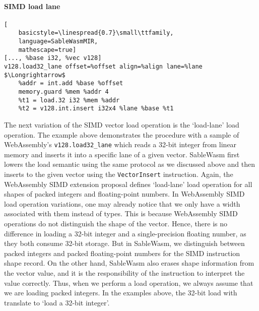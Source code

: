 \paragraph{SIMD load lane} \quad
\begin{lstlisting}[
    basicstyle=\linespread{0.7}\small\ttfamily, 
    language=SableWasmMIR, 
    mathescape=true]
[..., %base i32, %vec v128]
v128.load32_lane offset=%offset align=%align lane=%lane $\Longrightarrow$
    %addr = int.add %base %offset
    memory.guard %mem %addr 4
    %t1 = load.32 i32 %mem %addr
    %t2 = v128.int.insert i32x4 %lane %base %t1
\end{lstlisting}
The next variation of the SIMD vector load operation is the `load-lane' load
operation. The example above demonstrates the procedure with a sample of
WebAssembly's \texttt{v128.load32\_lane} which reads a 32-bit integer from
linear memory and inserts it into a specific lane of a given vector. SableWasm
first lowers the load semantic using the same protocol as we discussed above and
then inserts to the given vector using the \texttt{VectorInsert} instruction.
Again, the WebAssembly SIMD extension proposal defines `load-lane' load
operation for all shapes of packed integers and floating-point numbers. In
WebAssembly SIMD load operation variations, one may already notice that we only
have a width associated with them instead of types. This is because WebAssembly
SIMD operations do not distinguish the shape of the vector. Hence, there is no
difference in loading a 32-bit integer and a single-precision floating number,
as they both consume 32-bit storage. But in SableWasm, we distinguish between
packed integers and packed floating-point numbers for the SIMD instruction shape
record. On the other hand, SableWasm also erases shape information from the
vector value, and it is the responsibility of the instruction to interpret the
value correctly. Thus, when we perform a load operation, we always assume that
we are loading packed integers. In the examples above, the 32-bit load with
translate to `load a 32-bit integer'.

